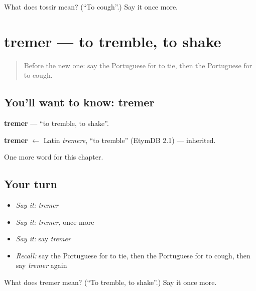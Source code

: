 \begin{tcolorbox}[breakable,colback=teal!4,colframe=teal!35!black,title={Before you move on}]
What does tossir mean? (\textquotedblleft{}To cough\textquotedblright{}.) Say it once more.
\end{tcolorbox}
\section[tremer]{tremer — to tremble, to shake}

\label{lesson:PT-C146-tremer}



\begin{quote}
Before the new one: say the Portuguese for to tie, then the Portuguese for to cough.
\end{quote}

\subsection*{You'll want to know: tremer}
\textbf{tremer} — \textquotedblleft{}to tremble, to shake\textquotedblright{}.

\begin{cousinweb}
\textbf{tremer} $\leftarrow$ Latin \emph{tremere}, \textquotedblleft{}to tremble\textquotedblright{} (EtymDB 2.1) — inherited.
\end{cousinweb}

\begin{grammarlens}[title={What you've built}]
One more word for this chapter.
\end{grammarlens}

\subsection*{Your turn}
\begin{itemize}
\raggedright
  \item \emph{Say it:} \emph{tremer}
  \item \emph{Say it:} \emph{tremer}, once more
  \item \emph{Say it:} say \emph{tremer}
  \item \emph{Recall:} say the Portuguese for to tie, then the Portuguese for to cough, then say \emph{tremer} again
\end{itemize}

\begin{tcolorbox}[breakable,colback=teal!4,colframe=teal!35!black,title={Before you move on}]
What does tremer mean? (\textquotedblleft{}To tremble, to shake\textquotedblright{}.) Say it once more.
\end{tcolorbox}
